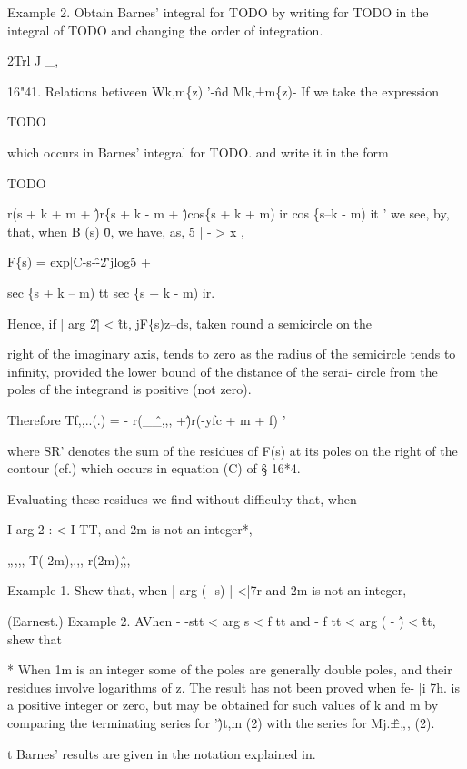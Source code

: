 %
%

Example 2. Obtain Barnes' integral for TODO by writing for TODO in the
integral of TODO and changing the order of integration.

2Trl J \_,

16"41. Relations betiveen Wk,m\{z) '-\^nd Mk,±m\{z)- If we take the
expression

TODO

which occurs in Barnes' integral for TODO. and write it in the form

TODO

r(s + k + m + \^)r\{s + k - m + \^)cos\{s + k + m) ir cos \{s--k - m)
it ' we see, by, that, when B (s) \^ 0, we have, as, 5 | - > x
,

F\{s) = exp|C-s-\^-2\^'jlog5 +

sec \{s + k -- m) tt sec \{s + k - m) ir.

Hence, if | arg 2\^ | < \^ tt, jF\{s)z--ds, taken round a semicircle
on the

right of the imaginary axis, tends to zero as the radius of the
semicircle tends to infinity, provided the lower bound of the distance
of the serai- circle from the poles of the integrand is positive (not
zero).

Therefore Tf,,..(.) = - r(\_\^\_,,, +\^)r(-yfc + m + f) '

where SR' denotes the sum of the residues of F(s) at its poles on the
right of the contour (cf.) which occurs in equation (C) of §
16*4.

Evaluating these residues we find without difficulty that, when

I arg 2 : < I TT, and 2m is not an integer*,

„,,, T(-2m),.,, r(2m),\^,,

Example 1. Shew that, when | arg ( -s) | <|7r and 2m is not an
integer,

(Earnest.) Example 2. AVhen - -stt < arg s < f tt and - f tt < arg ( -
\^) < \^tt, shew that

* When 1m is an integer some of the poles are generally double poles,
and their residues involve logarithms of z. The result has not been
proved when fe- |i 7h. is a positive integer or zero, but may be
obtained for such values of k and m by comparing the terminating
series for '\^)t,m (2) with the series for Mj.\^±„, (2).

t Barnes' results are given in the notation explained in.

